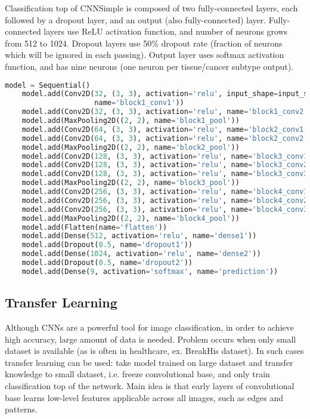 Classification top of CNNSimple is composed of two fully-connected layers, each followed by a dropout layer, and an output (also fully-connected) layer. Fully-connected layers use ReLU activation function, and number of neurons grows from 512 to 1024. Dropout layers use 50\% dropout rate (fraction of neurons which will be ignored in each passing). Output layer uses softmax activation function, and has nine neurons (one neuron per tissue/cancer subtype output). 
\vspace{3mm}
\begin{lstlisting}[language={Python}, basicstyle=\scriptsize]
	model = Sequential()
	model.add(Conv2D(32, (3, 3), activation='relu', input_shape=input_shape,     
	                 name='block1_conv1'))
	model.add(Conv2D(32, (3, 3), activation='relu', name='block1_conv2'))
	model.add(MaxPooling2D((2, 2), name='block1_pool'))
	model.add(Conv2D(64, (3, 3), activation='relu', name='block2_conv1'))
	model.add(Conv2D(64, (3, 3), activation='relu', name='block2_conv2'))
	model.add(MaxPooling2D((2, 2), name='block2_pool'))
	model.add(Conv2D(128, (3, 3), activation='relu', name='block3_conv1'))
	model.add(Conv2D(128, (3, 3), activation='relu', name='block3_conv2'))
	model.add(Conv2D(128, (3, 3), activation='relu', name='block3_conv3'))
	model.add(MaxPooling2D((2, 2), name='block3_pool'))
	model.add(Conv2D(256, (3, 3), activation='relu', name='block4_conv1'))
	model.add(Conv2D(256, (3, 3), activation='relu', name='block4_conv2'))
	model.add(Conv2D(256, (3, 3), activation='relu', name='block4_conv3'))
	model.add(MaxPooling2D((2, 2), name='block4_pool'))
	model.add(Flatten(name='flatten'))
	model.add(Dense(512, activation='relu', name='dense1'))
	model.add(Dropout(0.5, name='dropout1'))
	model.add(Dense(1024, activation='relu', name='dense2'))
	model.add(Dropout(0.5, name='dropout2'))
	model.add(Dense(9, activation='softmax', name='prediction'))
\end{lstlisting} 

\subsection{Transfer Learning}

Although CNNs are a powerful tool for image classification, in order to achieve high accuracy, large amount of data is needed. Problem occurs when only small dataset is available (as is often in healthcare, ex. BreakHis dataset). In such cases transfer learning can be used: take model trained on large dataset and transfer knowledge to small dataset, i.e. freeze convolutional base, and only train classification top of the network. Main idea is that early layers of convolutional base learns low-level features applicable across all images, such as edges and patterns.

